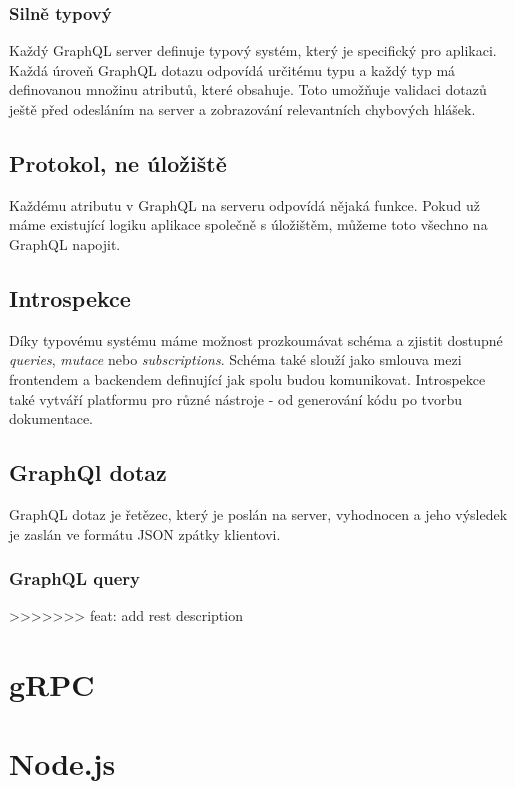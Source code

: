 \documentclass[thesis=M,czech]{FITthesis}[2019/12/23]
\begin{document}
\subsubsection*{Silně typový}
Každý GraphQL server definuje typový systém, který je specifický pro aplikaci.
Každá úroveň GraphQL dotazu odpovídá určitému typu a každý typ má definovanou množinu atributů, které obsahuje. Toto umožňuje validaci dotazů ještě před odesláním na server a zobrazování relevantních chybových hlášek.

\subsection*{Protokol, ne úložiště}
Každému atributu v GraphQL na serveru odpovídá nějaká funkce. Pokud už máme existující logiku aplikace společně s úložištěm, můžeme toto všechno na GraphQL napojit.

\subsection*{Introspekce}
Díky typovému systému máme možnost prozkoumávat schéma a zjistit dostupné \textit{queries}, \textit{mutace} nebo \textit{subscriptions}. Schéma také slouží jako smlouva mezi frontendem a backendem definující jak spolu budou komunikovat.
Introspekce také vytváří platformu pro různé nástroje - od generování kódu po tvorbu dokumentace.

\subsection*{GraphQl dotaz}
GraphQL dotaz je řetězec, který je poslán na server, vyhodnocen a jeho výsledek je zaslán ve formátu JSON zpátky klientovi.

\subsubsection*{GraphQL query}



>>>>>>> feat: add rest description

\section{gRPC}

\section{Node.js }
\end{document}
